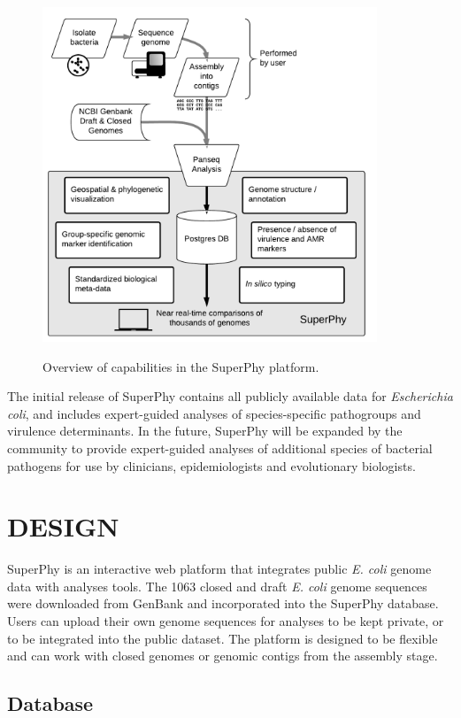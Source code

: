 \documentclass[a4paper,twoside]{article}
\begin{document}
\begin{figure}[t]
  \centering
   {\includegraphics[width=10cm]{capabilities.pdf}}
  \caption{Overview of capabilities in the SuperPhy platform.}
  \label{fig:capabilities}
\end{figure}

The initial release of SuperPhy contains all publicly available data for \textit{Escherichia coli}, and includes expert-guided analyses of species-specific pathogroups and virulence determinants. In the future, SuperPhy will be expanded by the community to provide expert-guided analyses of additional species of bacterial pathogens for use by clinicians, epidemiologists and evolutionary biologists.

\section{\uppercase{Design}}
\label{sec:design}

\noindent SuperPhy is an interactive web platform that integrates public \textit{E. coli} genome data with analyses tools. The 1063 closed and draft \textit{E. coli} genome sequences were downloaded from GenBank and incorporated into the SuperPhy database. Users can upload their own genome sequences for analyses to be kept private, or to be integrated into the public dataset. The platform is designed to be flexible and can work with closed genomes or genomic contigs from the assembly stage. 

\subsection{Database}
\end{document}
